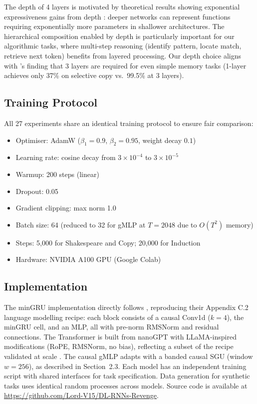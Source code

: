 \documentclass[10pt,a4paper]{article}
\begin{document}
The depth of 4 layers is motivated by theoretical results showing exponential expressiveness gains from depth \citep{telgarsky2016benefits}: deeper networks can represent functions requiring exponentially more parameters in shallower architectures. The hierarchical composition enabled by depth \citep{bengio2011shallow, montufar2014number} is particularly important for our algorithmic tasks, where multi-step reasoning (identify pattern, locate match, retrieve next token) benefits from layered processing. Our depth choice aligns with \citeauthor{feng2024were}'s finding that 3 layers are required for even simple memory tasks (1-layer achieves only 37\% on selective copy vs.\ 99.5\% at 3 layers).

\subsection{Training Protocol}

All 27 experiments share an identical training protocol to ensure fair comparison:
\begin{itemize}
    \item Optimiser: AdamW ($\beta_1{=}0.9$, $\beta_2{=}0.95$, weight decay $0.1$)
    \item Learning rate: cosine decay from $3 \times 10^{-4}$ to $3 \times 10^{-5}$
    \item Warmup: 200 steps (linear)
    \item Dropout: 0.05
    \item Gradient clipping: max norm 1.0
    \item Batch size: 64 (reduced to 32 for gMLP at $T{=}2048$ due to $O(T^2)$ memory)
    \item Steps: 5,000 for Shakespeare and Copy; 20,000 for Induction
    \item Hardware: NVIDIA A100 GPU (Google Colab)
\end{itemize}

\subsection{Implementation}

The minGRU implementation directly follows \citet{feng2024were}, reproducing their Appendix C.2 language modelling recipe: each block consists of a causal Conv1d ($k{=}4$), the minGRU cell, and an MLP, all with pre-norm RMSNorm and residual connections. The Transformer is built from nanoGPT with LLaMA-inspired modifications (RoPE, RMSNorm, no bias), reflecting a subset of the recipe validated at scale \citep{touvron2023llama}. The causal gMLP adapts \citet{liu2021pay} with a banded causal SGU (window $w{=}256$), as described in Section~2.3. Each model has an independent training script with shared interfaces for task specification. Data generation for synthetic tasks uses identical random processes across models. Source code is available at \url{https://github.com/Lord-V15/DL-RNNs-Revenge}.
\end{document}

